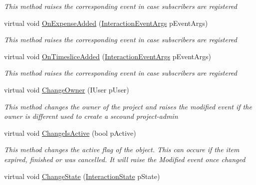 \begin{DoxyCompactItemize}
\begin{DoxyCompactList}\small\item\em This method raises the corresponding event in case subscribers are registered \end{DoxyCompactList}\item 
virtual void \hyperlink{class_plex_byte_1_1_mo_cap_1_1_interactions_1_1_account_a85ea096cc8598da7ec635311e20c77f4}{On\+Expense\+Added} (\hyperlink{class_plex_byte_1_1_mo_cap_1_1_interactions_1_1_interaction_event_args}{Interaction\+Event\+Args} p\+Event\+Args)
\begin{DoxyCompactList}\small\item\em This method raises the corresponding event in case subscribers are registered \end{DoxyCompactList}\item 
virtual void \hyperlink{class_plex_byte_1_1_mo_cap_1_1_interactions_1_1_account_a978de8f575c4f196808d37836c960202}{On\+Timeslice\+Added} (\hyperlink{class_plex_byte_1_1_mo_cap_1_1_interactions_1_1_interaction_event_args}{Interaction\+Event\+Args} p\+Event\+Args)
\begin{DoxyCompactList}\small\item\em This method raises the corresponding event in case subscribers are registered \end{DoxyCompactList}\item 
virtual void \hyperlink{class_plex_byte_1_1_mo_cap_1_1_interactions_1_1_account_a7220958b8470021790726ae8e68078a5}{Change\+Owner} (I\+User p\+User)
\begin{DoxyCompactList}\small\item\em This method changes the owner of the project and raises the modified event if the owner is different used to create a secound project-\/admin \end{DoxyCompactList}\item 
virtual void \hyperlink{class_plex_byte_1_1_mo_cap_1_1_interactions_1_1_account_aa599051753ac017c4fa2613fa16be415}{Change\+Is\+Active} (bool p\+Active)
\begin{DoxyCompactList}\small\item\em This method changes the active flag of the object. This can occure if the item expired, finished or was cancelled. It will raise the Modified event once changed \end{DoxyCompactList}\item 
virtual void \hyperlink{class_plex_byte_1_1_mo_cap_1_1_interactions_1_1_account_a3dadb5bcabffdec7afad04af7c94e2f0}{Change\+State} (\hyperlink{namespace_plex_byte_1_1_mo_cap_1_1_interactions_afcb673d9186608b6bd3b187179aedc8a}{Interaction\+State} p\+State)

\end{DoxyCompactItemize}
